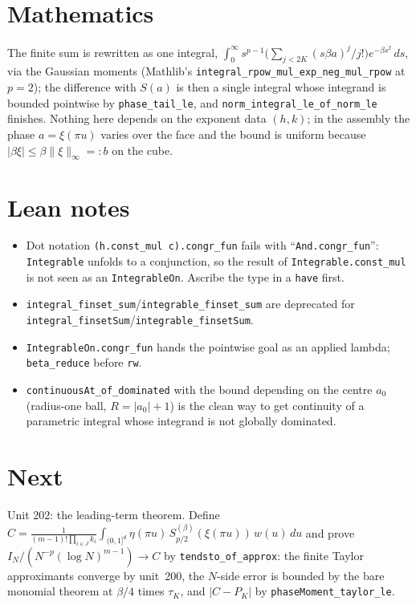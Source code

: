 \documentclass[11pt]{article}
\begin{document}
\section{Mathematics}
The finite sum is rewritten as one integral, $\int_0^\infty s^{p-1}\bigl(\sum_{j<2K}(s\beta a)^j/j!\bigr)e^{-\beta s^2}\,ds$,
via the Gaussian moments (Mathlib's \texttt{integral\_rpow\_mul\_exp\_neg\_mul\_rpow} at $p=2$);
the difference with $S(a)$ is then a single integral whose integrand is bounded pointwise by
\texttt{phase\_tail\_le}, and \texttt{norm\_integral\_le\_of\_norm\_le} finishes. Nothing here
depends on the exponent data $(h,k)$; in the assembly the phase $a=\xi(\pi u)$ varies over the face
and the bound is uniform because $|\beta\xi|\le\beta\|\xi\|_\infty=:b$ on the cube.

\section{Lean notes}
\begin{itemize}
\item Dot notation \texttt{(h.const\_mul c).congr\_fun} fails with ``\texttt{And.congr\_fun}'':
  \texttt{Integrable} unfolds to a conjunction, so the result of \texttt{Integrable.const\_mul}
  is not seen as an \texttt{IntegrableOn}. Ascribe the type in a \texttt{have} first.
\item \texttt{integral\_finset\_sum}/\texttt{integrable\_finset\_sum} are deprecated for
  \texttt{integral\_finsetSum}/\texttt{integrable\_finsetSum}.
\item \texttt{IntegrableOn.congr\_fun} hands the pointwise goal as an applied lambda;
  \texttt{beta\_reduce} before \texttt{rw}.
\item \texttt{continuousAt\_of\_dominated} with the bound depending on the centre $a_0$ (radius-one
  ball, $R=|a_0|+1$) is the clean way to get continuity of a parametric integral whose integrand is
  not globally dominated.
\end{itemize}

\section{Next}
Unit 202: the leading-term theorem. Define
$C=\frac{1}{(m-1)!\prod_{i\in J}k_i}\int_{(0,1]^d}\eta(\pi u)\,S^{(\beta)}_{p/2}(\xi(\pi u))\,w(u)\,du$
and prove $I_N/(N^{-p}(\log N)^{m-1})\to C$ by \texttt{tendsto\_of\_approx}: the finite Taylor
approximants converge by unit~200, the $N$-side error is bounded by the bare monomial theorem at
$\beta/4$ times $\tau_K$, and $|C-P_K|$ by \texttt{phaseMoment\_taylor\_le}.
\end{document}
